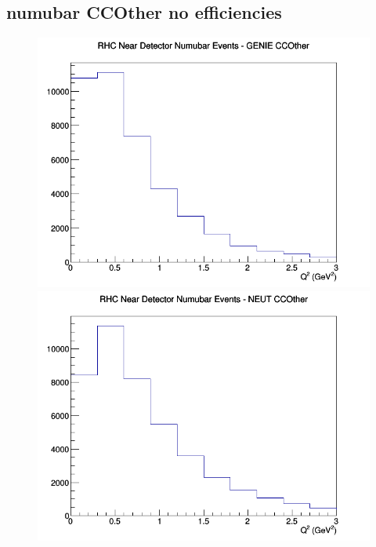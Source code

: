 \documentclass[12pt]{article}
\begin{document}
\subsection{numubar CCOther no efficiencies}
\begin{figure}[h]
\includegraphics[width=\linewidth]{Q2/nominal/CCOther_RHC_ND_numubar_Q2_GENIE.png}
\endminipage
{}
\includegraphics[width=\linewidth]{Q2/nominal/CCOther_RHC_ND_numubar_Q2_NEUT.png}
\endminipage
{}

\end{figure}
\end{document}
